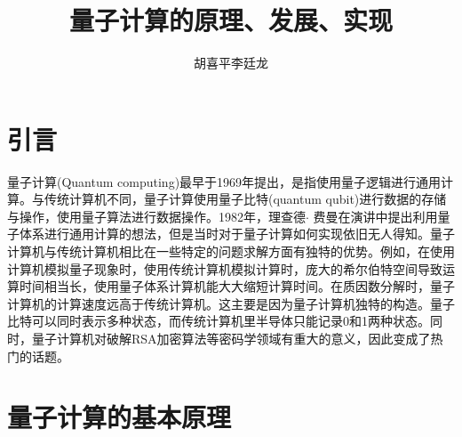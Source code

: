 \documentclass{article}
\author{胡喜平\quad 李廷龙}
\title{量子计算的原理、发展、实现}
\begin{document}
\maketitle
\section{引言}
\label{sec:label}
量子计算(Quantum computing)最早于1969年提出，是指使用量子逻辑进行通用计算。与传统计算机不同，量子计算使用量子比特(quantum qubit)进行数据的存储与操作，使用量子算法进行数据操作。1982年，理查德$\cdot$ 费曼在演讲中提出利用量子体系进行通用计算的想法，但是当时对于量子计算如何实现依旧无人得知。量子计算机与传统计算机相比在一些特定的问题求解方面有独特的优势。例如，在使用计算机模拟量子现象时，使用传统计算机模拟计算时，庞大的希尔伯特空间导致运算时间相当长，使用量子体系计算机能大大缩短计算时间。在质因数分解时，量子计算机的计算速度远高于传统计算机。这主要是因为量子计算机独特的构造。量子比特可以同时表示多种状态，而传统计算机里半导体只能记录0和1两种状态。同时，量子计算机对破解RSA加密算法等密码学领域有重大的意义，因此变成了热门的话题。

\section{量子计算的基本原理}
\label{sec:label}
\end{document}
